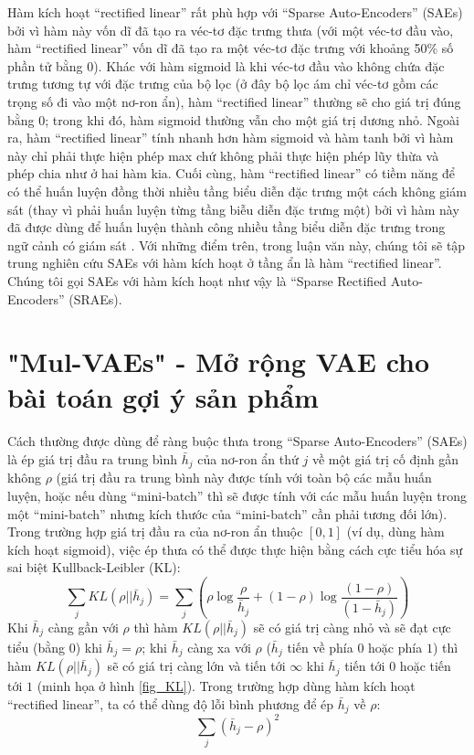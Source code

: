 Hàm kích hoạt ``rectified linear'' rất phù hợp với ``Sparse Auto-Encoders''  (SAEs) bởi vì hàm này vốn dĩ đã tạo ra véc-tơ đặc trưng thưa (với một véc-tơ đầu vào, hàm ``rectified linear'' vốn dĩ đã tạo ra một véc-tơ đặc trưng với khoảng 50\% số phần tử bằng 0). Khác với hàm sigmoid là khi véc-tơ đầu vào không chứa đặc trưng tương tự với đặc trưng của bộ lọc (ở đây bộ lọc ám chỉ véc-tơ gồm các trọng số đi vào một nơ-ron ẩn), hàm ``rectified linear'' thường sẽ cho giá trị đúng bằng 0; trong khi đó, hàm sigmoid thường vẫn cho một giá trị dương nhỏ. Ngoài ra, hàm ``rectified linear'' tính nhanh hơn hàm sigmoid và hàm tanh bởi vì hàm này chỉ phải thực hiện phép max chứ không phải thực hiện phép lũy thừa và phép chia như ở hai hàm kia. Cuối cùng, hàm ``rectified linear'' có tiềm năng để có thể huấn luyện đồng thời nhiều tầng biểu diễn đặc trưng một cách không giám sát (thay vì phải huấn luyện từng tầng biễu diễn đặc trưng một) bởi vì hàm này đã được dùng để huấn luyện thành công nhiều tầng biểu diễn đặc trưng trong ngữ cảnh có giám sát \cite{glorot2011deep}\cite{zeiler2013rectified}. Với những điểm trên, trong luận văn này, chúng tôi sẽ tập trung nghiên cứu SAEs với hàm kích hoạt ở tầng ẩn là hàm ``rectified linear''. Chúng tôi gọi SAEs với hàm kích hoạt như vậy là ``Sparse Rectified Auto-Encoders''  (SRAEs).
\section{"Mul-VAEs" - Mở rộng VAE cho bài toán gợi ý sản phẩm}

Cách thường được dùng để ràng buộc thưa trong ``Sparse Auto-Encoders''  (SAEs) là ép giá trị đầu ra trung bình $\bar{h}_j$ của nơ-ron ẩn thứ $j$ về một giá trị cố định gần không $\rho$ \cite{goodfellow2009measuring}\cite{coates2011analysis}\cite{coates2012demystifying} (giá trị đầu ra trung bình này được tính với toàn bộ các mẫu huấn luyện, hoặc nếu dùng ``mini-batch'' thì sẽ được tính với các mẫu huấn luyện trong một ``mini-batch'' nhưng kích thước của ``mini-batch'' cần phải tương đối lớn). Trong trường hợp giá trị đầu ra của nơ-ron ẩn thuộc $[0, 1]$ (ví dụ, dùng hàm kích hoạt sigmoid), việc ép thưa có thể được thực hiện bằng cách cực tiểu hóa sự sai biệt Kullback-Leibler (KL):
\begin{equation}
	\sum_jKL(\rho||\bar{h}_j) = \sum_j\left(\rho\log\frac{\rho}{\bar{h}_j} + (1-\rho)\log\frac{(1-\rho)}{(1-\bar{h}_j)}\right)
	\label{eq_lifetime_KL}
\end{equation}
Khi $\bar{h}_j$ càng gần với $\rho$ thì hàm $KL(\rho||\bar{h}_j)$ sẽ có giá trị càng nhỏ và sẽ đạt cực tiểu (bằng $0$) khi $\bar{h}_j = \rho$; khi $\bar{h}_j$ càng xa với $\rho$ ($\bar{h}_j$ tiến về phía $0$ hoặc phía $1$) thì hàm $KL(\rho||\bar{h}_j)$ sẽ có giá trị càng lớn và tiến tới $\infty$ khi $\bar{h}_j$ tiến tới $0$ hoặc tiến tới $1$ (minh họa ở hình \ref{fig_KL}). Trong trường hợp dùng hàm kích hoạt ``rectified linear'', ta có thể dùng độ lỗi bình phương để ép $\bar{h}_j$ về $\rho$:
\begin{equation}
	\sum_j(\bar{h}_j - \rho)^2
	\label{eq_lifetime_SE}
\end{equation}

